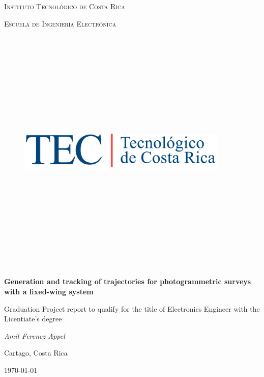 \begin{titlepage}
	\centering
	{\scshape\LARGE Instituto Tecnológico de Costa Rica \par}
	\vspace{1cm}
    {\scshape\Large Escuela de Ingeniería Electrónica \par}
    \vspace{1cm}
    
    \begin{figure}[hb]
	\centering
	\includegraphics[width=10cm,height=12cm,keepaspectratio]{imagenes/tec.png}
	\end{figure}
    
	\vspace{1cm}
	{\LARGE\bfseries Generation and tracking of trajectories for photogrammetric surveys with a fixed-wing system\par}
	\vspace{1cm}
    {\LARGE Graduation Project report to qualify for the title of Electronics Engineer with the Licentiate's degree
\par}
    \vspace{1cm}
    {\LARGE\itshape Amit Ferencz Appel\par}
    \vfill
	{\Large Cartago, Costa Rica\par}

	{\large \today\par}
\end{titlepage}